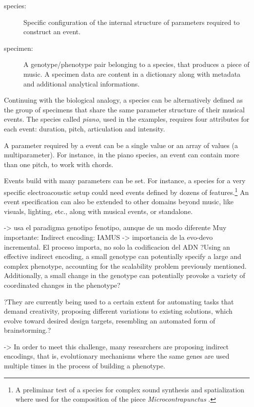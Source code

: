 \documentclass{article}
\begin{document}
\begin{description}
\item[species:] Specific configuration of the internal structure of parameters required to construct an event.
\item[specimen:] A genotype/phenotype pair belonging to a species, that produces a piece of music. A specimen data are content in a dictionary along with metadata and additional analytical informations.
\end{description}


Continuing with the biological analogy, a {species} can be alternatively defined as the group of specimens that share the same parameter structure of their musical events. The species called \emph{piano}, used in the examples, requires four attributes for each event: duration, pitch, articulation and intensity. 

A {parameter} required by a event can be a single value or an array of values (a {multiparameter}). For instance, in the piano species, an event can contain more than one pitch, to work with chords.

Events build with many parameters can be set. For instance, a species for a very specific electroacoustic setup could need events defined by dozens of features.\footnote{A preliminar test of a species for complex sound synthesis and spatialization where used for the composition of the piece \emph{Microcontrapunctus} \cite{microcontrapunctus}.} An event specification can also be extended to other domains beyond music, like visuals, lighting, etc., along with musical events, or standalone. 

{\color{red}




 -> usa el paradigma genotipo fenotipo, aunque de un modo diferente
Muy importante: Indirect encoding: IAMUS -> importancia de la evo-devo incremental. El proceso importa, no solo la codificacion del ADN
?Using an effective indirect encoding, a small
genotype can potentially specify a large and complex
phenotype, accounting for the scalability problem
previously mentioned. Additionally, a small change
in the genotype can potentially provoke a variety of
coordinated changes in the phenotype?

?They are currently
being used to a certain extent for automating
tasks that demand creativity, proposing different
variations to existing solutions, which evolve toward
desired design targets, resembling an automated form
of brainstorming.?


\cite{stanley:alife03} -> In order to meet this
challenge, many researchers are proposing indirect
encodings, that is, evolutionary mechanisms where the same
genes are used multiple times in the process of building a
phenotype.

}
\end{document}
